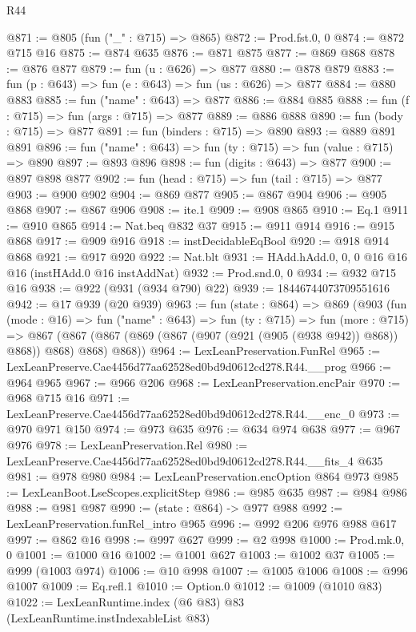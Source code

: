 \begin{lexlean}{R44}
\begin{coremodule}
@871 := @805 (fun ("_" : @715) => @865)
@872 := Prod.fst.{0, 0}
@874 := @872 @715 @16
@875 := @874 @635
@876 := @871 @875
@877 := @869 @868
@878 := @876 @877
@879 := fun (u : @626) => @877
@880 := @878 @879
@883 := fun (p : @643) => fun (e : @643) => fun (us : @626) => @877
@884 := @880 @883
@885 := fun ("name" : @643) => @877
@886 := @884 @885
@888 := fun (f : @715) => fun (args : @715) => @877
@889 := @886 @888
@890 := fun (body : @715) => @877
@891 := fun (binders : @715) => @890
@893 := @889 @891 @891
@896 := fun ("name" : @643) => fun (ty : @715) => fun (value : @715) => @890
@897 := @893 @896
@898 := fun (digits : @643) => @877
@900 := @897 @898 @877
@902 := fun (head : @715) => fun (tail : @715) => @877
@903 := @900 @902
@904 := @869 @877
@905 := @867 @904
@906 := @905 @868
@907 := @867 @906
@908 := ite.{1}
@909 := @908 @865
@910 := Eq.{1}
@911 := @910 @865
@914 := Nat.beq @832 @37
@915 := @911 @914
@916 := @915 @868
@917 := @909 @916
@918 := instDecidableEqBool
@920 := @918 @914 @868
@921 := @917 @920
@922 := Nat.blt
@931 := HAdd.hAdd.{0, 0, 0} @16 @16 @16 (instHAdd.{0} @16 instAddNat)
@932 := Prod.snd.{0, 0}
@934 := @932 @715 @16
@938 := @922 (@931 (@934 @790) @22)
@939 := 18446744073709551616
@942 := @17 @939 (@20 @939)
@963 := fun (state : @864) =>
  @869
    (@903
      (fun (mode : @16) =>
      fun ("name" : @643) =>
      fun (ty : @715) =>
      fun (more : @715) =>
      @867 (@867 (@867 (@869 (@867 (@907 (@921 (@905 (@938 @942)) @868)) @868)) @868) @868) @868))
@964 := LexLeanPreservation.FunRel
@965 := LexLeanPreserve.Cae4456d77aa62528ed0bd9d0612cd278.R44.__prog
@966 := @964 @965
@967 := @966 @206
@968 := LexLeanPreservation.encPair
@970 := @968 @715 @16
@971 := LexLeanPreserve.Cae4456d77aa62528ed0bd9d0612cd278.R44.__enc_0
@973 := @970 @971 @150
@974 := @973 @635
@976 := @634 @974 @638
@977 := @967 @976
@978 := LexLeanPreservation.Rel
@980 := LexLeanPreserve.Cae4456d77aa62528ed0bd9d0612cd278.R44.__fits_4 @635
@981 := @978 @980
@984 := LexLeanPreservation.encOption @864 @973
@985 := LexLeanBoot.LseScopes.explicitStep
@986 := @985 @635
@987 := @984 @986
@988 := @981 @987
@990 := (state : @864) -> @977 @988
@992 := LexLeanPreservation.funRel_intro @965
@996 := @992 @206 @976 @988 @617
@997 := @862 @16
@998 := @997 @627
@999 := @2 @998
@1000 := Prod.mk.{0, 0}
@1001 := @1000 @16
@1002 := @1001 @627
@1003 := @1002 @37
@1005 := @999 (@1003 @974)
@1006 := @10 @998
@1007 := @1005 @1006
@1008 := @996 @1007
@1009 := Eq.refl.{1}
@1010 := Option.{0}
@1012 := @1009 (@1010 @83)
@1022 := LexLeanRuntime.index
    (@6 @83)
    @83
    (LexLeanRuntime.instIndexableList @83)

\end{coremodule}
\end{lexlean}
